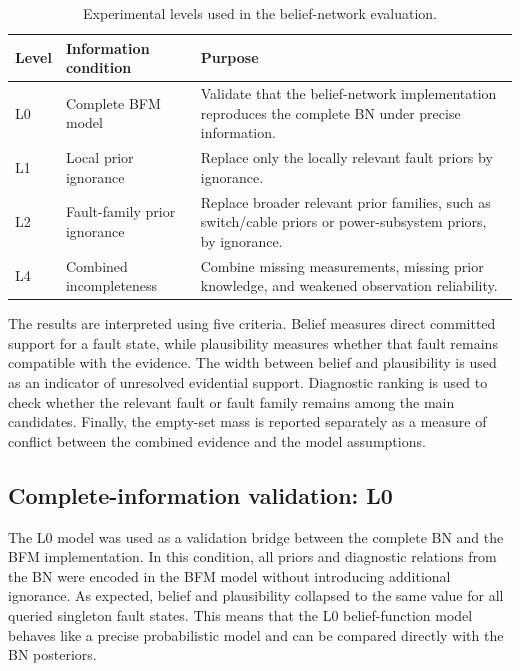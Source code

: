 \documentclass[runningheads]{llncs}
\begin{document}
\begin{table}[H]
\caption{Experimental levels used in the belief-network evaluation.}\label{tab:experiment_levels}
\centering
\small
\begin{tabularx}{\textwidth}{p{1.2cm}p{3.1cm}X}
\toprule
Level & Information condition & Purpose \\
\midrule
L0 & Complete BFM model & Validate that the belief-network implementation reproduces the complete BN under precise information. \\
L1 & Local prior ignorance & Replace only the locally relevant fault priors by ignorance. \\
L2 & Fault-family prior ignorance & Replace broader relevant prior families, such as switch/cable priors or power-subsystem priors, by ignorance. \\
L4 & Combined incompleteness & Combine missing measurements, missing prior knowledge, and weakened observation reliability. \\
\bottomrule
\end{tabularx}
\end{table}

The results are interpreted using five criteria. Belief measures direct committed support for a fault state, while plausibility measures whether that fault remains compatible with the evidence. The width between belief and plausibility is used as an indicator of unresolved evidential support. Diagnostic ranking is used to check whether the relevant fault or fault family remains among the main candidates. Finally, the empty-set mass is reported separately as a measure of conflict between the combined evidence and the model assumptions.

\subsection{Complete-information validation: L0}
\label{sec:l0_validation}

The L0 model was used as a validation bridge between the complete BN and the BFM implementation. In this condition, all priors and diagnostic relations from the BN were encoded in the BFM model without introducing additional ignorance. As expected, belief and plausibility collapsed to the same value for all queried singleton fault states. This means that the L0 belief-function model behaves like a precise probabilistic model and can be compared directly with the BN posteriors.
\end{document}
